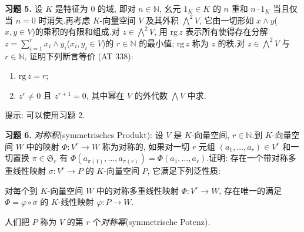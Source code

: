 \medskip
\noindent\textbf{习题 5.} 设 $K$ 是特征为 $0$ 的域, 即对 $n \in \mathbb{N}$, 幺元 $1_K \in K$ 的 $n$ 重和 $n \cdot 1_K$ 当且仅当 $n = 0$ 时消失.再考虑 $K$-向量空间 $V$ 及其外积 $\bigwedge^2 V$, 它由一切形如 $x \wedge y$($x, y \in V$)的乘积的有限和组成.对 $z \in \bigwedge^2 V$, 用 $\mathrm{rg}\, z$ 表示所有使得存在分解 $z = \sum_{i = 1}^{r} x_i \wedge y_i$($x_i, y_i \in V$)的 $r \in \mathbb{N}$ 的最小值; $\mathrm{rg}\, z$ 称为 $z$ 的秩.对 $z \in \bigwedge^2 V$ 与 $r \in \mathbb{N}$, 证明下列断言等价 (AT 338):
\begin{enumerate}
\item[(i)] $\mathrm{rg}\, z = r$;
\item[(ii)] $z^r \neq 0$ 且 $z^{r+1} = 0$, 其中幂在 $V$ 的外代数 $\bigwedge V$ 中求.
\end{enumerate}

提示: 可以使用习题 2.

\medskip
\noindent\textbf{习题 6.} \emph{对称积}(\textup{symmetrisches Produkt}): 设 $V$ 是 $K$-向量空间, $r \in \mathbb{N}$.到 $K$-向量空间 $W$ 中的映射 $\Phi \colon V^r \longrightarrow W$ 称为对称的, 如果对一切 $r$ 元组 $(a_1, \ldots, a_r) \in V^r$ 和一切置换 $\pi \in \mathfrak{S}_r$ 有 $\Phi(a_{\pi(1)}, \ldots, a_{\pi(r)}) = \Phi(a_1, \ldots, a_r)$.证明: 存在一个带对称多重线性映射 $\sigma \colon V^r \longrightarrow P$ 的 $K$-向量空间 $P$, 它满足下列泛性质:

对每个到 $K$-向量空间 $W$ 中的对称多重线性映射 $\Phi \colon V^r \longrightarrow W$, 存在唯一的满足 $\Phi = \varphi \circ \sigma$ 的 $K$-线性映射 $\varphi \colon P \longrightarrow W$.

人们把 $P$ 称为 $V$ 的第 $r$ 个\emph{对称幂}(\textup{symmetrische Potenz}).
